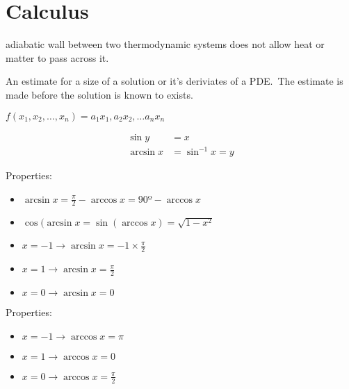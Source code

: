 \section{Calculus}

\begin{definition}[Adiabatic]
    adiabatic wall between two thermodynamic systems does not allow heat or
    matter to pass across it. 

\end{definition}

\begin{definition}
    An estimate for a size of a solution or it's deriviates of a PDE.\
    The estimate is made before the solution is known to exists.

\end{definition}

\begin{definition}[Affine]
    $ 
    f(x_{1}, x_{2}, \dots, x_{n}) = 
    a_{1}x_{1}, a_{2}x_{2}, \dots a_{n}x_{n}
    $
\end{definition}

\begin{definition}[arcsin]
    \begin{align*}
        \sin{y} &= x \\
        \arcsin{x} &= \sin^{-1}{x} = y
    \end{align*}

    Properties:
    \begin{itemize}
        \item $\arcsin{x} = \frac{\pi}{2} - \arccos{x} = 90º - \arccos{x}$
        \item $\cos{(\arcsin{x}} = \sin{(\arccos{x})} = \sqrt{1-x^{2}}{}$
        \item $ x = -1 \rightarrow \arcsin{x} = -1\times\frac{\pi}{2}$
        \item $ x = 1 \rightarrow \arcsin{x} = \frac{\pi}{2}$
        \item $ x = 0 \rightarrow \arcsin{x} = 0$
    \end{itemize}
\end{definition}

\begin{definition}[arccos]\label{arccos}
    Properties:
    \begin{itemize}
        \item $ x = -1 \rightarrow \arccos{x} = \pi$
        \item $ x = 1 \rightarrow \arccos{x} = 0$
        \item $ x = 0 \rightarrow \arccos{x} = \frac{\pi}{2}$
    \end{itemize}
\end{definition}

